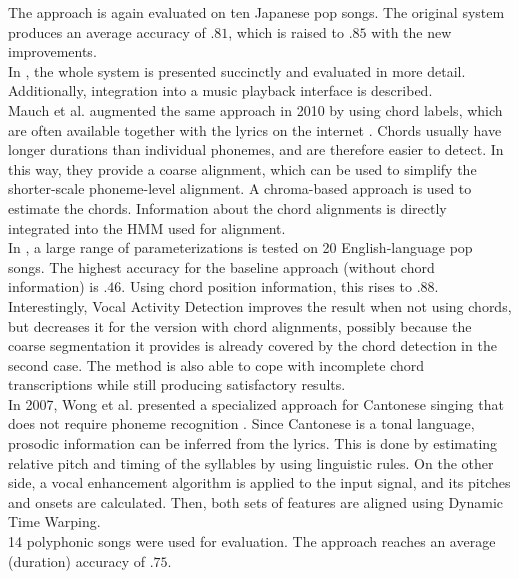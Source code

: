 The approach is again evaluated on ten Japanese pop songs. The original system produces an average accuracy of $.81$, which is raised to $.85$ with the new improvements.\\
In \cite{FujiharaGOO11}, the whole system is presented succinctly and evaluated in more detail. Additionally, integration into a music playback interface is described.\\

Mauch et al. augmented the same approach in 2010 by using chord labels, which are often available together with the lyrics on the internet \cite{mauch_alignment2010}  \cite{mauch_alignment2}. Chords usually have longer durations than individual phonemes, and are therefore easier to detect. In this way, they provide a coarse alignment, which can be used to simplify the shorter-scale phoneme-level alignment. A chroma-based approach is used to estimate the chords. Information about the chord alignments is directly integrated into the HMM used for alignment.\\
In \cite{mauch_alignment2}, a large range of parameterizations is tested on 20 English-language pop songs. The highest accuracy for the baseline approach (without chord information) is $.46$. Using chord position information, this rises to $.88$. Interestingly, Vocal Activity Detection improves the result when not using chords, but decreases it for the version with chord alignments, possibly because the coarse segmentation it provides is already covered by the chord detection in the second case. The method is also able to cope with incomplete chord transcriptions while still producing satisfactory results.\\

In 2007, Wong et al. presented a specialized approach for Cantonese singing that does not require phoneme recognition \cite{WongSW07}. Since Cantonese is a tonal language, prosodic information can be inferred from the lyrics. This is done by estimating relative pitch and timing of the syllables by using linguistic rules. On the other side, a vocal enhancement algorithm is applied to the input signal, and its pitches and onsets are calculated. Then, both sets of features are aligned using Dynamic Time Warping.\\ 
14 polyphonic songs were used for evaluation. The approach reaches an average (duration) accuracy of $.75$.\\

